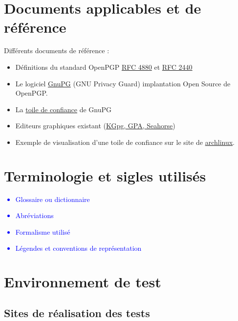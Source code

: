 \documentclass{../res/univ-projet}
\begin{document}
\section{Documents applicables et de référence}
Différents documents de référence :
\begin{itemize}
\item Définitions du standard OpenPGP \href{file:../../ressources/openPGP/rfc4880-en.pdf}{RFC 4880}
  et \href{file:../../ressources/openPGP/rfc2440-fr.pdf}{RFC 2440}
\item Le logiciel \href{https://www.gnupg.org/}{GnuPG} (GNU Privacy Guard) implantation Open Source
  de OpenPGP.
\item La \href{https://www.gnupg.org/gph/fr/manual.html#AEN541}{toile de confiance} de GnuPG
\item Editeurs graphiques existant 
  (\href{http://www.gnupg.org/related_software/frontends.en.html}{KGpg, GPA, Seahorse})
\item Exemple de visualisation d'une toile de confiance sur le site de 
  \href{https://www.archlinux.org/master-keys/#visualization}{archlinux}.
\end{itemize}

\section{Terminologie et sigles utilisés}
\textcolor{blue}{
  \begin{itemize}
  \item Glossaire ou dictionnaire
  \item Abréviations
  \item Formalisme utilisé
  \item Légendes et conventions de représentation
  \end{itemize}
}

\section{Environnement de test}
\subsection{Sites de réalisation des tests}
\end{document}
